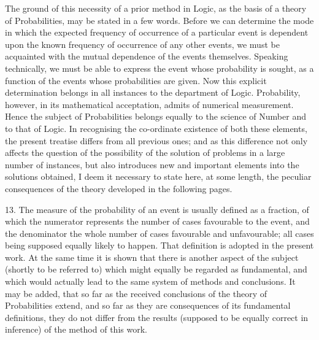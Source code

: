 \documentclass[oneside]{book}
\begin{document}
The ground of this necessity of a prior method in Logic, as
the basis of a theory of Probabilities, may be stated in a few
words. Before we can determine the mode in which the expected
frequency of occurrence of a particular event is dependent upon
the known frequency of occurrence of any other events, we must be
acquainted with the mutual dependence of the events themselves.
Speaking technically, we must be able to express the event
whose probability is sought, as a function of the events whose
probabilities are given. Now this explicit determination belongs
in all instances to the department of Logic. Probability, however,
in its mathematical acceptation, admits of numerical measurement.
Hence the subject of Probabilities belongs equally to
the science of Number and to that of Logic. In recognising the
co-ordinate existence of both these elements, the present treatise
differs from all previous ones; and as this difference not only
affects the question of the possibility of the solution of problems
in a large number of instances, but also introduces new and important
elements into the solutions obtained, I deem it necessary
to state here, at some length, the peculiar consequences of the
theory developed in the following pages.

13. The measure of the probability of an event is usually
defined as a fraction, of which the numerator represents the number
of cases favourable to the event, and the denominator the
whole number of cases favourable and unfavourable; all cases
being supposed equally likely to happen. That definition is
adopted in the present work. At the same time it is shown that
there is another aspect of the subject (shortly to be referred to)
which might equally be regarded as fundamental, and which
would actually lead to the same system of methods and conclusions.
It may be added, that so far as the received conclusions
of the theory of Probabilities extend, and so far as they are consequences
of its fundamental definitions, they do not differ from
the results (supposed to be equally correct in inference) of the
method of this work.
\end{document}
